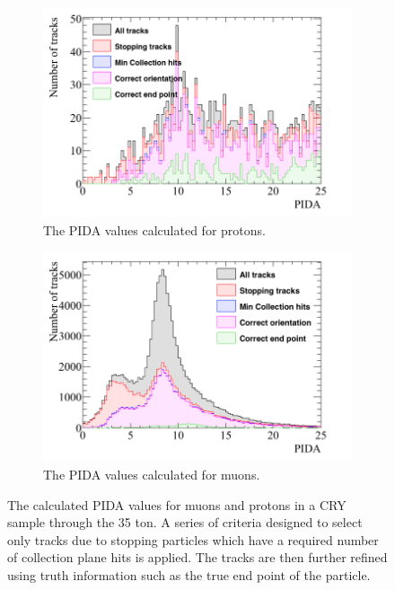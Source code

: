 \begin{figure}[h!]
  \centering
  \begin{subfigure}{0.48\textwidth}
        \centering
        \includegraphics[width=\textwidth]{EnrinchedSample_500V_v06_18_00_Proton_PIDA}
        \caption{The PIDA values calculated for protons.}
        \label{fig:CRY_PIDA_Proton}
  \end{subfigure}%
  \hspace{0.03\textwidth}%
  \begin{subfigure}{0.48\textwidth}
        \centering
        \includegraphics[width=\textwidth]{EnrinchedSample_500V_v06_18_00_Muon_PIDA}
        \caption{The PIDA values calculated for muons.}
        \label{fig:CRY_PIDA_Muon}
  \end{subfigure}
  \caption[The calculated PIDA values for muons and protons in a CRY sample through the 35 ton]
          {The calculated PIDA values for muons and protons in a CRY sample through the 35 ton. A series of criteria designed to select only tracks due to stopping particles which have a required number of collection plane hits is applied. The tracks are then further refined using truth information such as the true end point of the particle.}
  \label{fig:CRY_PIDA}
\end{figure}
